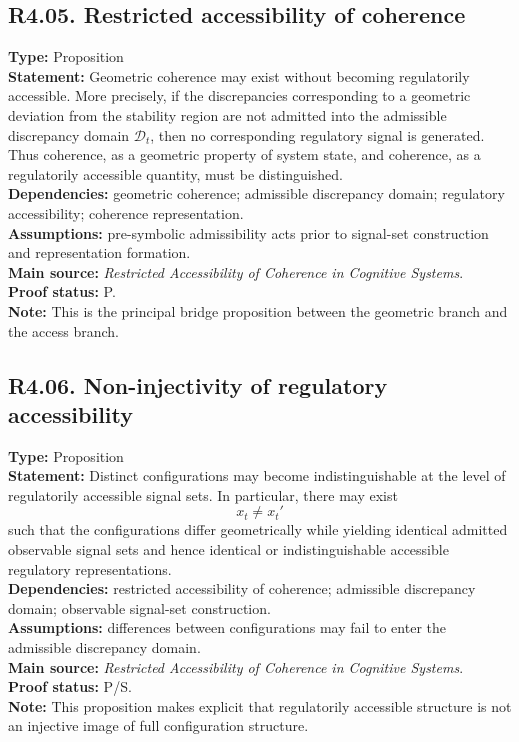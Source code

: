 \documentclass[12pt]{article}
\begin{document}
	\subsection*{R4.05. Restricted accessibility of coherence}
	\textbf{Type:} Proposition \\
	\textbf{Statement:} Geometric coherence may exist without becoming regulatorily accessible.
	More precisely, if the discrepancies corresponding to a geometric deviation from the stability
	region are not admitted into the admissible discrepancy domain $\mathcal{D}_t$, then no corresponding
	regulatory signal is generated. Thus coherence, as a geometric property of system state, and
	coherence, as a regulatorily accessible quantity, must be distinguished. \\
	\textbf{Dependencies:} geometric coherence; admissible discrepancy domain; regulatory
	accessibility; coherence representation. \\
	\textbf{Assumptions:} pre-symbolic admissibility acts prior to signal-set construction and
	representation formation. \\
	\textbf{Main source:} \emph{Restricted Accessibility of Coherence in Cognitive Systems}. \\
	\textbf{Proof status:} P. \\
	\textbf{Note:} This is the principal bridge proposition between the geometric branch and the
	access branch.
	
	\subsection*{R4.06. Non-injectivity of regulatory accessibility}
	\textbf{Type:} Proposition \\
	\textbf{Statement:} Distinct configurations may become indistinguishable at the level of
	regulatorily accessible signal sets. In particular, there may exist
	\[
	x_t \neq x_t'
	\]
	such that the configurations differ geometrically while yielding identical admitted observable
	signal sets and hence identical or indistinguishable accessible regulatory representations. \\
	\textbf{Dependencies:} restricted accessibility of coherence; admissible discrepancy domain;
	observable signal-set construction. \\
	\textbf{Assumptions:} differences between configurations may fail to enter the admissible
	discrepancy domain. \\
	\textbf{Main source:} \emph{Restricted Accessibility of Coherence in Cognitive Systems}. \\
	\textbf{Proof status:} P/S. \\
	\textbf{Note:} This proposition makes explicit that regulatorily accessible structure is not an
	injective image of full configuration structure.
	
\end{document}
